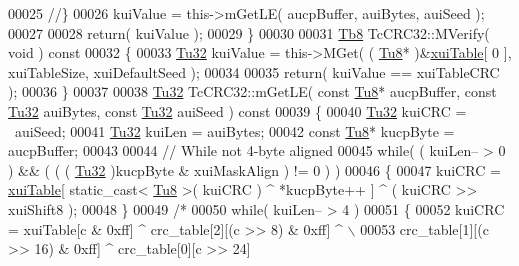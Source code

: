 \begin{DoxyCode}
00025    \textcolor{comment}{//\}}
00026    kuiValue = this->mGetLE( aucpBuffer, auiBytes, auiSeed );
00027 
00028    \textcolor{keywordflow}{return}( kuiValue );
00029 \}
00030 
00031 \mbox{\hyperlink{namespace_g_n_common_a8115dc7ed53b6e5b52e6bfde1632ea74}{Tb8}} TcCRC32::MVerify( \textcolor{keywordtype}{void} )\textcolor{keyword}{ const}
00032 \textcolor{keyword}{}\{
00033    \mbox{\hyperlink{namespace_g_n_common_a941b527ef318f318aed7903dc832b7e4}{Tu32}} kuiValue = this->MGet( ( \mbox{\hyperlink{namespace_g_n_common_a7939e251ddbf5d3a31832dcfdc8bde39}{Tu8}}* )&\mbox{\hyperlink{class_g_n_common_1_1_n_data_authentication_1_1_tc_c_r_c32_a2c841dc8051fc7e1719224929f24b32d}{xuiTable}}[ 0 ], xuiTableSize, xuiDefaultSeed );
00034 
00035    \textcolor{keywordflow}{return}( kuiValue == xuiTableCRC );
00036 \}
00037 
00038 \mbox{\hyperlink{namespace_g_n_common_a941b527ef318f318aed7903dc832b7e4}{Tu32}} TcCRC32::mGetLE( \textcolor{keyword}{const} \mbox{\hyperlink{namespace_g_n_common_a7939e251ddbf5d3a31832dcfdc8bde39}{Tu8}}* aucpBuffer, \textcolor{keyword}{const} \mbox{\hyperlink{namespace_g_n_common_a941b527ef318f318aed7903dc832b7e4}{Tu32}} auiBytes, \textcolor{keyword}{const} 
      \mbox{\hyperlink{namespace_g_n_common_a941b527ef318f318aed7903dc832b7e4}{Tu32}} auiSeed )\textcolor{keyword}{ const}
00039 \textcolor{keyword}{}\{
00040    \mbox{\hyperlink{namespace_g_n_common_a941b527ef318f318aed7903dc832b7e4}{Tu32}}       kuiCRC   = ~auiSeed;
00041    \mbox{\hyperlink{namespace_g_n_common_a941b527ef318f318aed7903dc832b7e4}{Tu32}}       kuiLen   = auiBytes;
00042    \textcolor{keyword}{const} \mbox{\hyperlink{namespace_g_n_common_a7939e251ddbf5d3a31832dcfdc8bde39}{Tu8}}* kucpByte = aucpBuffer;
00043 
00044    \textcolor{comment}{// While not 4-byte aligned}
00045    \textcolor{keywordflow}{while}( ( kuiLen-- > 0 ) && ( ( ( \mbox{\hyperlink{namespace_g_n_common_a941b527ef318f318aed7903dc832b7e4}{Tu32}} )kucpByte & xuiMaskAlign ) != 0 ) )
00046    \{
00047       kuiCRC = \mbox{\hyperlink{class_g_n_common_1_1_n_data_authentication_1_1_tc_c_r_c32_a2c841dc8051fc7e1719224929f24b32d}{xuiTable}}[ \textcolor{keyword}{static\_cast<} \mbox{\hyperlink{namespace_g_n_common_a7939e251ddbf5d3a31832dcfdc8bde39}{Tu8}} \textcolor{keyword}{>}( kuiCRC ) ^ *kucpByte++ ] ^ ( kuiCRC >> xuiShift8 );
00048    \}
00049    \textcolor{comment}{/*}
00050 \textcolor{comment}{   while( kuiLen-- > 4 )}
00051 \textcolor{comment}{   \{}
00052 \textcolor{comment}{      kuiCRC = xuiTable[c & 0xff] ^ crc\_table[2][(c >> 8) & 0xff] ^ \(\backslash\)}
00053 \textcolor{comment}{         crc\_table[1][(c >> 16) & 0xff] ^ crc\_table[0][c >> 24]}

\end{DoxyCode}
